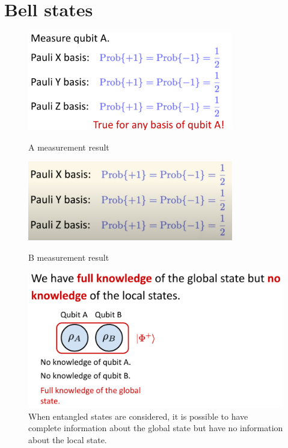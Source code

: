 \section{Bell states}

\begin{figure}[H]
    \centering
    \includegraphics[width=0.8\textwidth]{lesson4/Qubit_A.pdf}
    \label{fig: 1}
    
        \caption{A measurement result}
    
\end{figure}

\begin{figure}[H]
    \centering
    \includegraphics[width=0.8\textwidth]{lesson4/Qubit_B.pdf}
    \label{fig: 1}
    
        \caption{B measurement result}
    
\end{figure}
\fi

\begin{figure}[H]
    \centering
    \includegraphics[width=1.0\textwidth]{lesson4/4.3_Recap.pdf}
        \caption[Complete global but no local information]{When entangled states are considered, it is possible to have complete information about the global state but have no information about the local state.}
    \label{fig:incomplete-information}
\end{figure}

